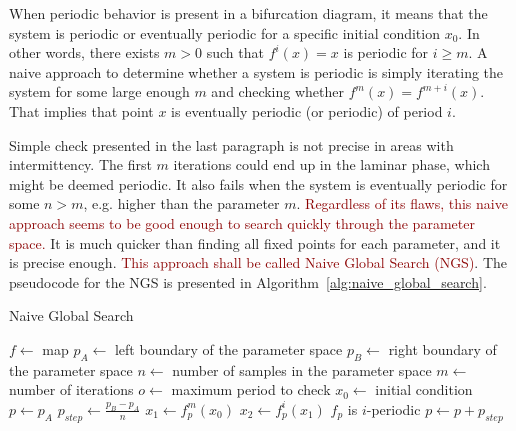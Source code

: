 When periodic behavior is present in a bifurcation diagram, it means that the system is periodic or eventually periodic for a specific initial condition $x_0$.
In other words, there exists $m > 0$ such that $f^{i}(x)=x$ is periodic for $i \geq m$.
A naive approach to determine whether a system is periodic is simply iterating the system for some large enough $m$ and checking whether $f^{m}(x)=f^{m+i}(x)$.
That implies that point $x$ is eventually periodic (or periodic) of period $i$.
\par
Simple check presented in the last paragraph is not precise in areas with intermittency.
The first $m$ iterations could end up in the laminar phase, which might be deemed periodic.
It also fails when the system is eventually periodic for some $n > m$, e.g. higher than the parameter $m$.
\textcolor{darkred}{Regardless of its flaws, this naive approach seems to be good enough to search quickly through the parameter space.}
It is much quicker than finding all fixed points for each parameter, and it is precise enough.
\textcolor{darkred}{This approach shall be called Naive Global Search (NGS)}.
The pseudocode for the NGS is presented in Algorithm~\ref{alg:naive_global_search}.

\begin{algorithm}[!h]
    \caption{Naive Global Search}
    \label{alg:naive_global_search}
    \begin{algorithmic}[1]
        \Statex $f \gets$ map
        \Statex $p_{A} \gets$ left boundary of the parameter space
        \Statex $p_{B} \gets$ right boundary of the parameter space
        \Statex $n \gets$ number of samples in the parameter space
        \Statex $m \gets$ number of iterations
        \Statex $o \gets$ maximum period to check
        \Statex $x_0 \gets$ initial condition
        \State $p \gets p_{A}$
        \State $p_{step} \gets \frac{p_{B} - p_{A}}{n}$
            \State $x_1 \gets f_{p}^{m}(x_0)$
                \State $x_2 \gets f_{p}^{i}(x_1)$
                    \State $f_p$ is $i$-periodic
                \EndIf
            \EndFor
            \State $p \gets p + p_{step}$
        \EndWhile
    \end{algorithmic}
\end{algorithm}

